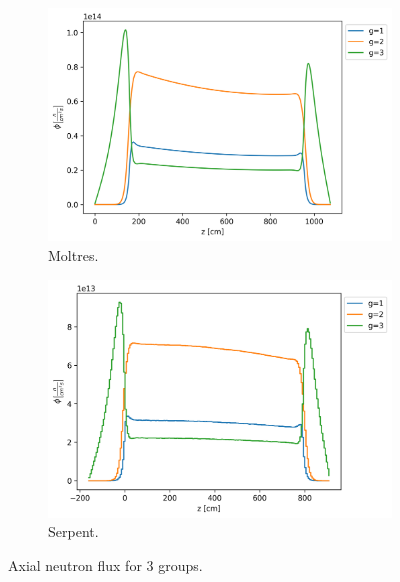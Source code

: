 \documentclass[11pt,letterpaper]{article}
\begin{document}
\begin{figure}[htbp!]
	\centering
	\begin{subfigure}[t]{0.4\textwidth}
		\centering
		\includegraphics[width=\linewidth]{figures/3D-assembly-LBP-600-26G}
		\caption{Moltres.}
	\end{subfigure}
	\begin{subfigure}[t]{0.4\textwidth}
		\centering
		\includegraphics[width=\linewidth]{figures/serpent26G-LBP-600-collapse}
		\caption{Serpent.}
	\end{subfigure}
	\hfill
	\caption{Axial neutron flux for 3 groups.}
	\label{fig:assembly-LBP-600-flux}
\end{figure}
\end{document}

